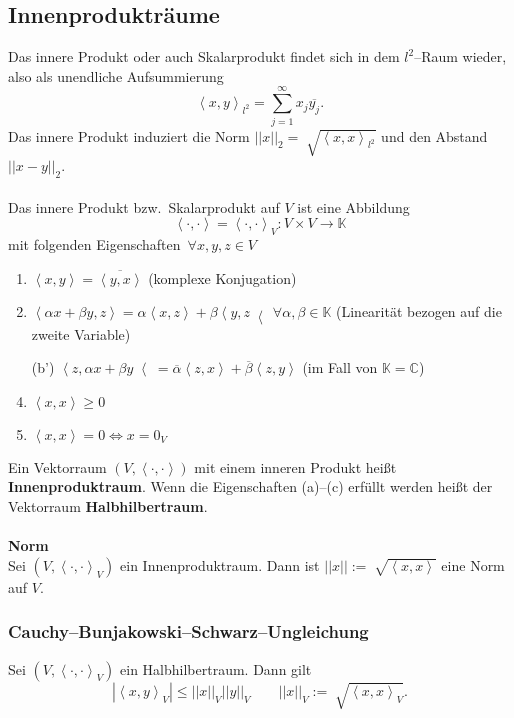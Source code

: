 \documentclass[a4paper,12pt]{article}
\begin{document}
\subsection{Innenprodukträume}
Das innere Produkt oder auch Skalarprodukt findet sich in dem $l^2$--Raum wieder, also als unendliche Aufsummierung
\[ 
        \left\langle x,y\right\rangle _{l^2}=\sum_{j=1}^{\infty}x_j\overline{y_j}
.\] 
Das innere Produkt induziert die Norm $||x|| _2=\sqrt[ ]{\left\langle x,x\right\rangle _{l^2}}$ und den Abstand $||x-y||_2$.\\\\\noindent
Das innere Produkt bzw.\, Skalarprodukt auf $V$ ist eine Abbildung 
\[ 
        \left\langle \cdot ,\cdot \right\rangle =\left\langle \cdot ,\cdot \right\rangle _V:V\times V\rightarrow \mathbb{K}
\] 
mit folgenden Eigenschaften $\,\forall x,y,z \in V$ 
\begin{enumerate}[label=(\alph*)]
        \item $\left\langle x,y\right\rangle =\overline{\left\langle y,x\right\rangle }$ (komplexe Konjugation)
        \item $\left\langle \alpha x+\beta y,z\right\rangle =\alpha \left\langle x,z\right\rangle +\beta \left\langle y,z\right\langle \,\forall \alpha ,\beta  \in \mathbb{K}$ (Linearität bezogen auf die zweite Variable)
        \item[(b')] $\left\langle z,\alpha x+\beta y\right\langle =\overline{\alpha }\left\langle z,x\right\rangle +\overline{\beta }\left\langle z,y\right\rangle $ (im Fall von $\mathbb{K}=\mathbb{C}$)
        \item $\left\langle x,x\right\rangle \geq 0$ 
        \item $\left\langle x,x\right\rangle =0\Leftrightarrow x=0_V$ 
\end{enumerate}
Ein Vektorraum $\left(V,\left\langle \cdot ,\cdot \right\rangle \right)$ mit einem inneren Produkt heißt \textbf{Innenproduktraum}. Wenn die Eigenschaften (a)--(c) erfüllt werden heißt der Vektorraum \textbf{Halbhilbertraum}.
\\\hfill\\\textbf{Norm}\\ 
Sei $\left(V,\left\langle \cdot ,\cdot \right\rangle _V\right)$ ein Innenproduktraum. Dann ist $||x|| :=\sqrt[ ]{\left\langle x,x\right\rangle }$ eine Norm auf $V$.

\subsubsection{Cauchy--Bunjakowski--Schwarz--Ungleichung}
Sei $\left(V,\left\langle \cdot ,\cdot \right\rangle _V\right)$ ein Halbhilbertraum. Dann gilt
\[ 
        |\left\langle x,y\right\rangle _V|\leq ||x||_V||y||_V\qquad ||x||_V:=\sqrt[ ]{\left\langle x,x\right\rangle _V}
.\] 
\end{document}
